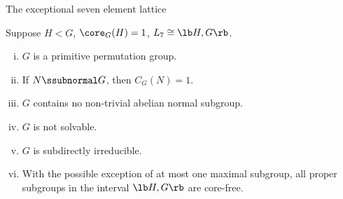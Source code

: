 \begin{frame}[fragile,label=NewConclusion,shrink=5]{The exceptional seven element lattice}
      \begin{center}
      \end{center}
    \begin{theorem}
      \label{thm:except-seven-elem}
      Suppose $H<G$, \hskip2mm $\core_G(H) = 1$, \hskip2mm $L_7 \cong \lb H,G \rb$.
      \begin{enumerate}[(i)]
      \item<1-> $G$ is a primitive permutation group.
      \item<1-> If $N\ssubnormal G$, then $C_G(N) = 1$.
      \item<1-> $G$ contains no non-trivial abelian normal subgroup.
      \item<1-> $G$ is not solvable.
      \item<1-> $G$ is subdirectly irreducible.
      \item<1-> With the possible exception of at most one maximal subgroup, %
        all proper subgroups in the interval $\lb H,G \rb$ are core-free. 
      \end{enumerate}
    \end{theorem}

\end{frame}







